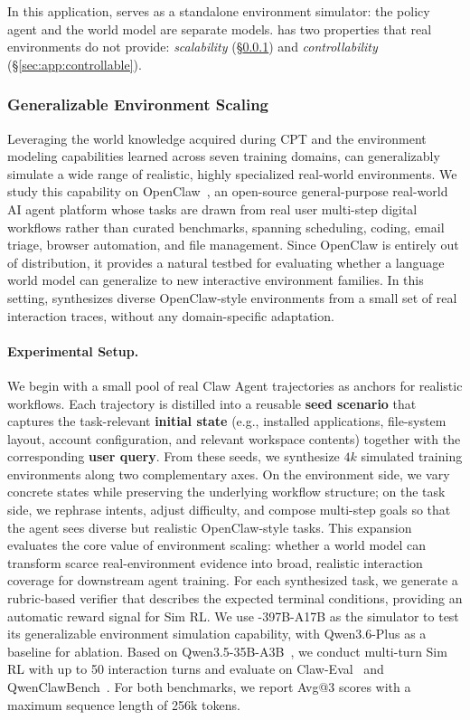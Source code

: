 In this application, \method serves as a standalone environment simulator: the policy agent and the world model are separate models.
\method has two properties that real environments do not provide: \emph{\textcolor{colorscale}{scalability}} (\S\ref{sec:app:scaling}) and \emph{\textcolor{colorctrl}{controllability}} (\S\ref{sec:app:controllable}).

\subsubsection{Generalizable Environment Scaling}
\label{sec:app:scaling}




Leveraging the world knowledge acquired during CPT and the environment modeling capabilities learned across seven training domains, \method can generalizably simulate a wide range of realistic, highly specialized real-world environments.
We study this capability on OpenClaw~\citep{openclaw2026}, an open-source general-purpose real-world AI agent platform whose tasks are drawn from real user multi-step digital workflows rather than curated benchmarks, spanning scheduling, coding, email triage, browser automation, and file management.
Since OpenClaw is entirely out of distribution, it provides a natural testbed for evaluating whether a language world model can generalize to new interactive environment families.
In this setting, \method synthesizes diverse OpenClaw-style environments from a small set of real interaction traces, without any domain-specific adaptation.

\paragraph{Experimental Setup.}
We begin with a small pool of real Claw Agent trajectories as anchors for realistic workflows.
Each trajectory is distilled into a reusable \textbf{seed scenario} that captures the task-relevant \textbf{initial state} (e.g., installed applications, file-system layout, account configuration, and relevant workspace contents) together with the corresponding \textbf{user query}.
From these seeds, we synthesize $4k$ simulated training environments along two complementary axes.
On the environment side, we vary concrete states while preserving the underlying workflow structure; on the task side, we rephrase intents, adjust difficulty, and compose multi-step goals so that the agent sees diverse but realistic OpenClaw-style tasks.
This expansion evaluates the core value of environment scaling: whether a world model can transform scarce real-environment evidence into broad, realistic interaction coverage for downstream agent training.
For each synthesized task, we generate a rubric-based verifier that describes the expected terminal conditions, providing an automatic reward signal for Sim RL.
We use \method-397B-A17B as the simulator to test its generalizable environment simulation capability, with Qwen3.6-Plus as a baseline for ablation.
Based on Qwen3.5-35B-A3B~\citep{qwen35blog}, we conduct multi-turn Sim RL with up to 50 interaction turns and evaluate on Claw-Eval~\citep{ye2026claw} and QwenClawBench~\citep{qwenclawbench}.
For both benchmarks, we report Avg@3 scores with a maximum sequence length of 256k tokens.


